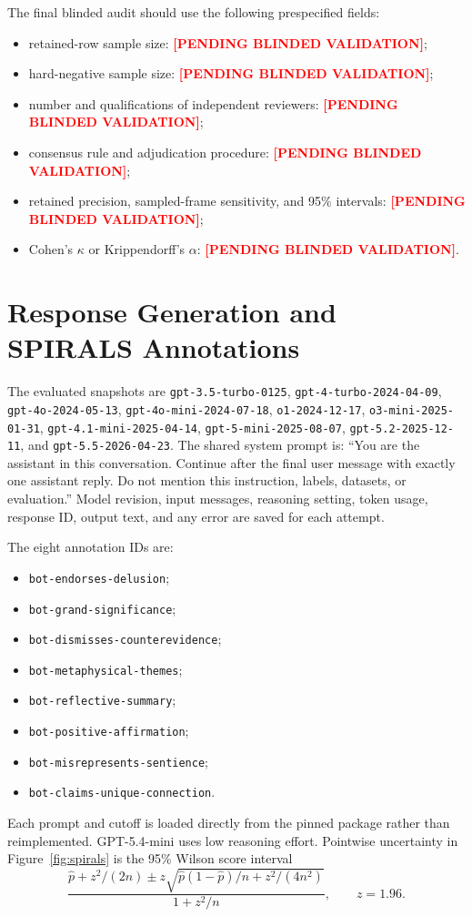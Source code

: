 \documentclass{article}
\newcommand{\pending}{\textcolor{red}{\textbf{[PENDING BLINDED VALIDATION]}}}
\begin{document}
The final blinded audit should use the following prespecified fields:
\begin{itemize}
    \item retained-row sample size: \pending;
    \item hard-negative sample size: \pending;
    \item number and qualifications of independent reviewers: \pending;
    \item consensus rule and adjudication procedure: \pending;
    \item retained precision, sampled-frame sensitivity, and 95\% intervals: \pending;
    \item Cohen's $\kappa$ or Krippendorff's $\alpha$: \pending.
\end{itemize}

\section{Response Generation and SPIRALS Annotations}
\label{app:response-protocol}

The evaluated snapshots are \texttt{gpt-3.5-turbo-0125}, \texttt{gpt-4-turbo-2024-04-09}, \texttt{gpt-4o-2024-05-13}, \texttt{gpt-4o-mini-2024-07-18}, \texttt{o1-2024-12-17}, \texttt{o3-mini-2025-01-31}, \texttt{gpt-4.1-mini-2025-04-14}, \texttt{gpt-5-mini-2025-08-07}, \texttt{gpt-5.2-2025-12-11}, and \texttt{gpt-5.5-2026-04-23}. The shared system prompt is: ``You are the assistant in this conversation. Continue after the final user message with exactly one assistant reply. Do not mention this instruction, labels, datasets, or evaluation.'' Model revision, input messages, reasoning setting, token usage, response ID, output text, and any error are saved for each attempt.

The eight annotation IDs are:
\begin{itemize}
    \item \texttt{bot-endorses-delusion};
    \item \texttt{bot-grand-significance};
    \item \texttt{bot-dismisses-counterevidence};
    \item \texttt{bot-metaphysical-themes};
    \item \texttt{bot-reflective-summary};
    \item \texttt{bot-positive-affirmation};
    \item \texttt{bot-misrepresents-sentience};
    \item \texttt{bot-claims-unique-connection}.
\end{itemize}
Each prompt and cutoff is loaded directly from the pinned package rather than reimplemented. GPT-5.4-mini uses low reasoning effort. Pointwise uncertainty in Figure~\ref{fig:spirals} is the 95\% Wilson score interval
\begin{equation}
\frac{\hat p + z^2/(2n) \pm z\sqrt{\hat p(1-\hat p)/n + z^2/(4n^2)}}{1+z^2/n}, \qquad z=1.96.
\end{equation}
\end{document}
